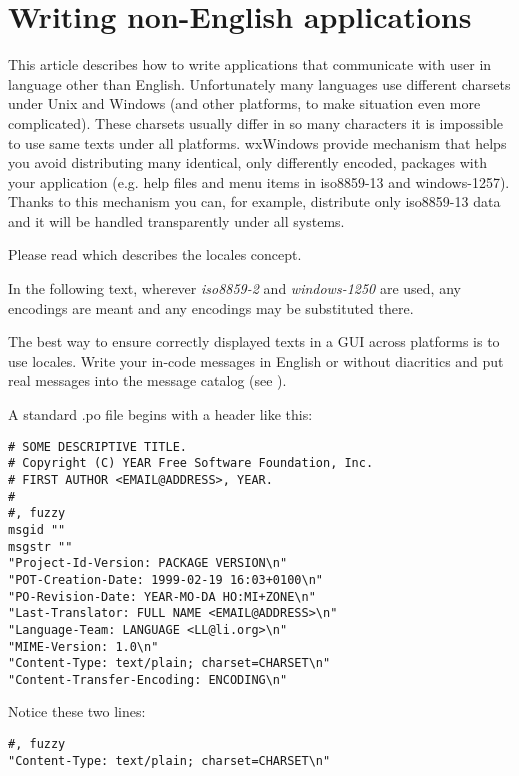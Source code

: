 \section{Writing non-English applications}\label{nonenglishoverview}

This article describes how to write applications that communicate with
user in language other than English. Unfortunately many languages use
different charsets under Unix and Windows (and other platforms, to make
situation even more complicated). These charsets usually differ in so
many characters it is impossible to use same texts under all platforms.
wxWindows provide mechanism that helps you avoid distributing many
identical, only differently encoded, packages with your application 
(e.g. help files and menu items in iso8859-13 and windows-1257). Thanks
to this mechanism you can, for example, distribute only iso8859-13 data 
and it will be handled transparently under all systems.

Please read  which
describes the locales concept.

In the following text, wherever {\it iso8859-2} and {\it windows-1250} are
used, any encodings are meant and any encodings may be substituted there.


The best way to ensure correctly displayed texts in a GUI across platforms
is to use locales. Write your in-code messages in English or without 
diacritics and put real messages into the message catalog (see 
).

A standard .po file begins with a header like this:

\begin{verbatim}
# SOME DESCRIPTIVE TITLE.
# Copyright (C) YEAR Free Software Foundation, Inc.
# FIRST AUTHOR <EMAIL@ADDRESS>, YEAR.
#
#, fuzzy
msgid ""
msgstr ""
"Project-Id-Version: PACKAGE VERSION\n"
"POT-Creation-Date: 1999-02-19 16:03+0100\n"
"PO-Revision-Date: YEAR-MO-DA HO:MI+ZONE\n"
"Last-Translator: FULL NAME <EMAIL@ADDRESS>\n"
"Language-Team: LANGUAGE <LL@li.org>\n"
"MIME-Version: 1.0\n"
"Content-Type: text/plain; charset=CHARSET\n"
"Content-Transfer-Encoding: ENCODING\n"
\end{verbatim}

Notice these two lines:

\begin{verbatim}
#, fuzzy
"Content-Type: text/plain; charset=CHARSET\n"
\end{verbatim}

